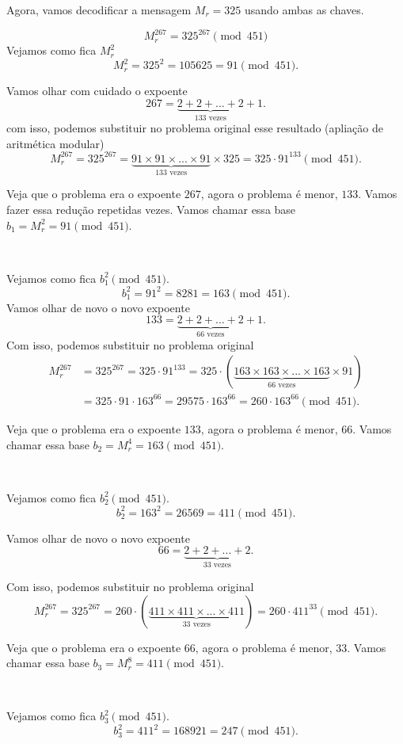 \documentclass[a4paper, 12pt]{article} %
\begin{document}
Agora, vamos decodificar a mensagem $M_r=325$ usando ambas as chaves.

\[
M_r^{267} = 325^{267}  \pmod{451}
\]
Vejamos como fica $M_r^2$
\[
M_r^{2}= 325^2 = 105625  = 91 \pmod{451}.
\]


Vamos olhar com cuidado o expoente
\[
267 = \underbrace{2+2+...+2}_{133 \mbox{ vezes}} + 1. 
\]
com isso, podemos substituir no problema original esse resultado (apliação de aritmética modular)
\[
M_r^{267} = 325^{267} = \underbrace{91 \times 91 \times ... \times 91}_{133 \mbox{ vezes}}\times 325 = 325\cdot 91^{133}\pmod{451}.
\]

Veja que o problema era o expoente $267$, agora o problema é menor, $133$. Vamos fazer essa redução repetidas vezes. Vamos chamar essa base $b_1 = M_r^2 = 91 \pmod{451}$.

\dotfill\,

Vejamos como fica $b_1^2 \pmod{451}$.
\[
b_1^2 = 91^2 = 8281 = 163 \pmod{451}.
\]
Vamos olhar de novo o novo expoente
\[
133 = \underbrace{2+2+...+2}_{66 \mbox{ vezes}} + 1.
\]
Com isso, podemos substituir no problema original
\[
\begin{aligned}
M_r^{267} & = 325^{267} = 325\cdot 91^{133} = 325\cdot (\underbrace{163 \times 163 \times ... \times 163}_{66 \mbox{ vezes}}\times 91) \\
          & = 325\cdot 91\cdot 163^{66}=29575\cdot 163^{66}=260\cdot 163^{66}\pmod{451}.
\end{aligned}
\]

Veja que o problema era o expoente $133$, agora o problema é menor, $66$. Vamos chamar essa base $b_2 = M_r^4 = 163 \pmod{451}$.

\dotfill\,

Vejamos como fica $b_2^2 \pmod{451}$.
\[
b_2^2 = 163^2 = 26569 = 411 \pmod{451}.
\]

Vamos olhar de novo o novo expoente
\[
66 = \underbrace{2+2+...+2}_{33 \mbox{ vezes}}.
\]

Com isso, podemos substituir no problema original
\[
M_r^{267}  = 325^{267} = 260\cdot (\underbrace{411 \times 411 \times ... \times 411}_{33 \mbox{ vezes}}) = 260\cdot 411^{33}\pmod{451}.
\]

Veja que o problema era o expoente $66$, agora o problema é menor, $33$. Vamos chamar essa base $b_3 = M_r^8 = 411 \pmod{451}$.


\dotfill\,

Vejamos como fica $b_3^2 \pmod{451}$.
\[
b_3^2 = 411^2 = 168921 = 247 \pmod{451}.
\]
\end{document}
